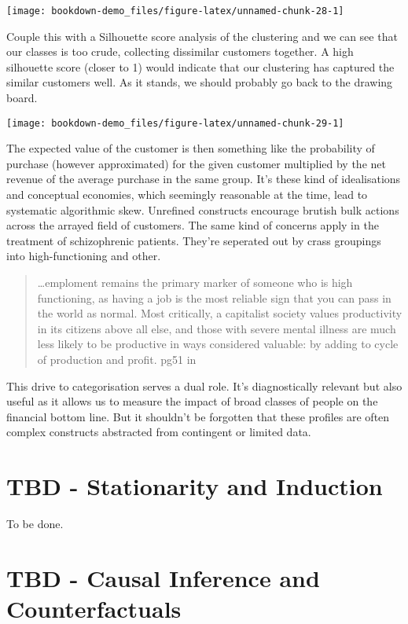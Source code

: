 \documentclass[]{tufte-book}
\theoremstyle{definition}
\theoremstyle{definition}
\theoremstyle{definition}
\theoremstyle{remark}
\begin{document}
\texttt{[image: bookdown-demo\_files/figure-latex/unnamed-chunk-28-1]}

Couple this with a Silhouette score analysis of the clustering and we can see that our classes is too crude, collecting dissimilar customers together. A high silhouette score (closer to 1) would indicate that our clustering has captured the similar customers well. As it stands, we should probably go back to the drawing board.

\texttt{[image: bookdown-demo\_files/figure-latex/unnamed-chunk-29-1]}

The expected value of the customer is then something like the probability of purchase (however approximated) for the given customer multiplied by the net revenue of the average purchase in the same group. It's these kind of idealisations and conceptual economies, which seemingly reasonable at the time, lead to systematic algorithmic skew. Unrefined constructs encourage brutish bulk actions across the arrayed field of customers. The same kind of concerns apply in the treatment of schizophrenic patients. They're seperated out by crass groupings into high-functioning and other.

\begin{quote}
\ldots emploment remains the primary marker of someone who is high functioning, as having a job is the most reliable sign that you can pass in the world as normal. Most critically, a capitalist society values productivity in its citizens above all else, and those with severe mental illness are much less likely to be productive in ways considered valuable: by adding to cycle of production and profit. pg51 in \citep{WangSchizophrenia}
\end{quote}

This drive to categorisation serves a dual role. It's diagnostically relevant but also useful as it allows us to measure the impact of broad classes of people on the financial bottom line. But it shouldn't be forgotten that these profiles are often complex constructs abstracted from contingent or limited data.

\hypertarget{tbd---stationarity-and-induction}{%
\chapter{TBD - Stationarity and Induction}\label{tbd---stationarity-and-induction}}

To be done.

\hypertarget{tbd---causal-inference-and-counterfactuals}{%
\chapter{TBD - Causal Inference and Counterfactuals}\label{tbd---causal-inference-and-counterfactuals}}
\end{document}
